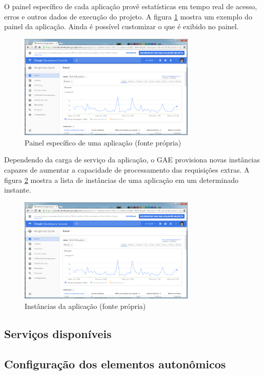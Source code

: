 \documentclass[12pt]{article}
\begin{document}
O painel específico de cada aplicação provê estatísticas em tempo real de
acesso, erros e outros dados de execução do projeto. A figura
\ref{fig:painel-app} mostra um exemplo do painel da aplicação. Ainda é possível
customizar o que é exibido no painel.

\begin{figure}
    \centering
    \includegraphics[width=0.75\textwidth]{painel-app.png}
    \caption{Painel específico de uma aplicação (fonte própria)}
    \label{fig:painel-app}
\end{figure}

Dependendo da carga de serviço da aplicação, o GAE provisiona novas instâncias
capazes de aumentar a capacidade de processamento das requisições extras. A
figura \ref{fig:instancias} mostra a lista de instâncias de uma aplicação em um
determinado instante.

\begin{figure}
    \centering
    \includegraphics[width=0.75\textwidth]{painel-app.png}
    \caption{Instâncias da aplicação (fonte própria)}
    \label{fig:instancias}
\end{figure}

\subsection{Serviços disponíveis}
\subsection{Configuração dos elementos autonômicos}
\end{document}
